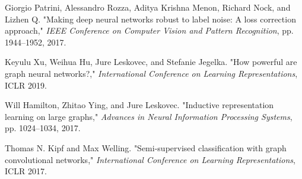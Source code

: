 \documentclass[portrait,final,archD,fontscale=0.477]{baposter}
\begin{document}
\begin{poster}
{\begin{thebibliography}{1}
       Giorgio Patrini, Alessandro Rozza, Aditya Krishna Menon, Richard Nock, and Lizhen Q. "Making deep neural networks robust to label noise: A loss correction approach," \textit{IEEE Conference on Computer Vision and Pattern Recognition}, pp.
      1944–1952, 2017.

       Keyulu Xu, Weihua Hu, Jure Leskovec, and Stefanie Jegelka. "How powerful are graph neural networks?," \textit{International Conference on Learning Representations}, ICLR 2019.

       Will Hamilton, Zhitao Ying, and Jure Leskovec. "Inductive representation learning on large graphs," \textit{Advances in Neural Information Processing Systems}, pp. 1024–1034, 2017.

       Thomas N. Kipf and Max Welling. "Semi-supervised classification with graph convolutional networks," \textit{International Conference on Learning Representations}, ICLR 2017.
   \end{thebibliography}
}

\end{poster}
\end{document}
